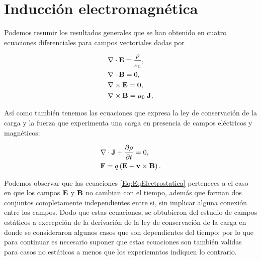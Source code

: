 \chapter{Inducción electromagnética}
Podemos resumir los resultados generales que se han obtenido en cuatro ecuaciones diferenciales para campos vectoriales dadas por

\begin{align}
	\label{Eq:EqElectrostatica}
	 & \nabla \cdot \textbf{E} = \frac{\rho}{\varepsilon_{0}}, \\
	 & \nabla \cdot \textbf{B} = 0,                            \\
	 & \nabla \times \textbf{E} = \textbf{0},                   \\
	 & \nabla \times \textbf{B} = \mu_{0}\; \textbf{J},
\end{align}

Así como también tenemos las ecuaciones que expresa la ley de conservación de la carga y la fuerza que experimenta una carga en presencia de campos eléctricos y magnéticos:

\begin{align}
	 & \divergence{\textbf{J}} + \diffp{\rho}{t} = 0,           \\
	 & \textbf{F} = q \left( \E + \textbf{v} \times \B \right).
\end{align}

Podemos observar que las ecuaciones \eqref{Eq:EqElectrostatica} perteneces a el caso en que los campos $\textbf{E}$ y $\textbf{B}$ no cambian con el tiempo, además que forman dos conjuntos completamente independientes entre si, sin implicar alguna conexión entre los campos. Dodo que estas ecuaciones, se obtubieron del estudio de campos estáticos a excecpción de la derivación de la ley de conservación de la carga en donde se consideraron algunos casos que son dependientes del tiempo; por lo que para continuar es necesario suponer que estas ecuaciones son también validas para casos no estáticos a menos que los experiemntos indiquen lo contrario.



